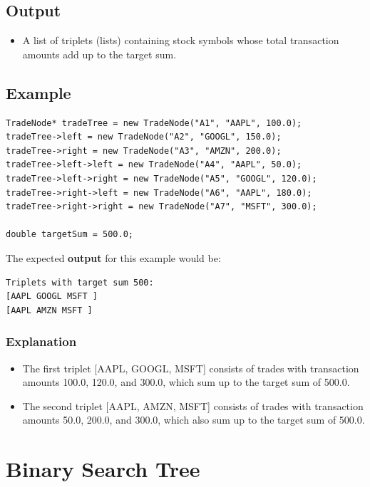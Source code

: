 \documentclass[11pt]{article}
\begin{document}
    \subsection{Output}
    \begin{itemize}
        \item A list of triplets (lists) containing stock symbols whose total transaction amounts add up to the target sum.
    \end{itemize}
    \subsection{Example}
    \begin{lstlisting}
TradeNode* tradeTree = new TradeNode("A1", "AAPL", 100.0);
tradeTree->left = new TradeNode("A2", "GOOGL", 150.0);
tradeTree->right = new TradeNode("A3", "AMZN", 200.0);
tradeTree->left->left = new TradeNode("A4", "AAPL", 50.0);
tradeTree->left->right = new TradeNode("A5", "GOOGL", 120.0);
tradeTree->right->left = new TradeNode("A6", "AAPL", 180.0);
tradeTree->right->right = new TradeNode("A7", "MSFT", 300.0);

double targetSum = 500.0;
\end{lstlisting}
The expected \textbf{output} for this example would be:
\begin{lstlisting}
Triplets with target sum 500:
[AAPL GOOGL MSFT ]
[AAPL AMZN MSFT ]
\end{lstlisting}
\subsubsection{Explanation}
\begin{itemize}
    \item The first triplet [AAPL, GOOGL, MSFT] consists of trades with transaction amounts 100.0, 120.0, and 300.0, which sum up to the target sum of 500.0.
    \item The second triplet [AAPL, AMZN, MSFT] consists of trades with transaction amounts 50.0, 200.0, and 300.0, which also sum up to the target sum of 500.0.
\end{itemize}



\section{Binary Search Tree}
\end{document}
